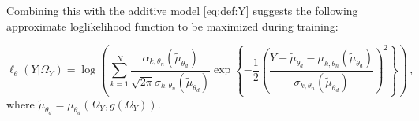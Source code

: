 \documentclass{article}
\begin{document}
Combining this with the additive model  \eqref{eq:def:Y} suggests the following approximate loglikelihood function to be maximized during training:

$$
\ell_{\theta}(Y|\Omega_{Y}) = \log\left(\sum_{k=1}^N\frac{\alpha_{k,\theta_n}(\tilde\mu_{\theta_d})}{\sqrt{2\pi }\sigma_{k,\theta_n}(\tilde\mu_{\theta_d})}\exp\left\{-\frac{1}{2}\left(\frac{Y-\tilde\mu_{\theta_d} -  \mu_{k,\theta_n}(\tilde\mu_{\theta_d})}{\sigma_{k,\theta_n}(\tilde\mu_{\theta_d})}\right)^2\right\}\right)\,,
$$
where $\tilde \mu_{\theta_d} = \mu_{\theta_d}(\Omega_{Y},g(\Omega_{Y}))$.
%
\end{document}
